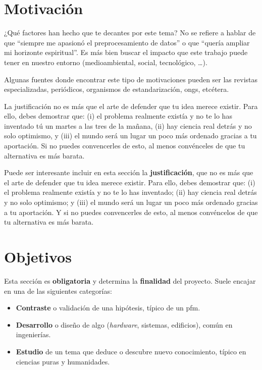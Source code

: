 \section{Motivación}
\label{s:motivacion}

¿Qué factores han hecho que te decantes por este tema? No se refiere a hablar de que \enquote{siempre me apasionó el preprocesamiento de datos} o que \enquote{quería ampliar mi horizonte espiritual}. Es más bien buscar el impacto que este trabajo puede tener en nuestro entorno (medioambiental, social, tecnológico, \ldots).

Algunas fuentes donde encontrar este tipo de motivaciones pueden ser las revistas especializadas, periódicos, organismos de estandarización, \glspl{ong}, etcétera.

La justificación no es más que el arte de defender que tu idea merece existir. Para ello, debes demostrar que: (i) el problema realmente existía y no te lo has inventado tú un martes a las tres de la mañana, (ii) hay ciencia real detrás y no solo optimismo, y (iii) el mundo será un lugar un poco más ordenado gracias a tu aportación. Si no puedes convencerles de esto, al menos convénceles de que tu alternativa es más barata.

Puede ser interesante incluir en esta sección la \textbf{justificación}, que no es más que el arte de defender que tu idea merece existir. Para ello, debes demostrar que: (i) el problema realmente existía y no te lo has inventado; (ii) hay ciencia real detrás y no solo optimismo; y (iii) el mundo será un lugar un poco más ordenado gracias a tu aportación. Y si no puedes convencerles de esto, al menos convéncelos de que tu alternativa es más barata.

\section{Objetivos}

Esta sección es \textbf{obligatoria} y determina la \textbf{finalidad} del proyecto. Suele encajar en una de las siguientes categorías:

\begin{itemize}
    \item \textbf{Contraste} o validación de una hipótesis, típico de un \gls{pfm}.
    \item \textbf{Desarrollo} o diseño de algo (\textit{hardware}, sistemas, edificios), común en ingenierías.
    \item \textbf{Estudio} de un tema que deduce o descubre nuevo conocimiento, típico en ciencias puras y humanidades.
\end{itemize}

